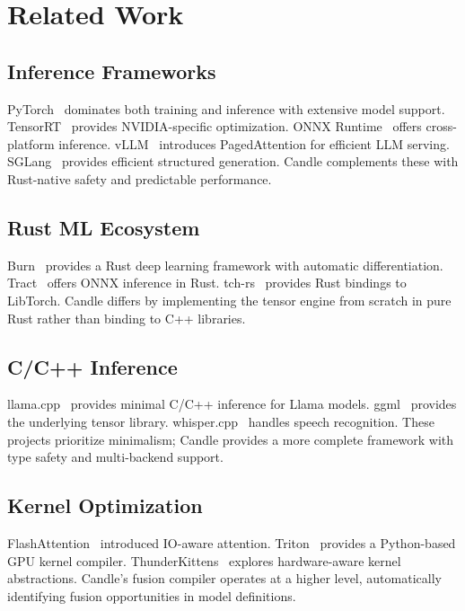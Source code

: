 \section{Related Work}

\label{sec:related}

\subsection{Inference Frameworks}

PyTorch~\cite{paszke2019pytorch} dominates both training and inference with extensive model support. TensorRT~\cite{tensorrt2017} provides NVIDIA-specific optimization. ONNX Runtime~\cite{onnxruntime2019} offers cross-platform inference. vLLM~\cite{kwon2023vllm} introduces PagedAttention for efficient LLM serving. SGLang~\cite{zheng2024sglang} provides efficient structured generation. Candle complements these with Rust-native safety and predictable performance.

\subsection{Rust ML Ecosystem}

Burn~\cite{burn2023} provides a Rust deep learning framework with automatic differentiation. Tract~\cite{tract2023} offers ONNX inference in Rust. tch-rs~\cite{tchrs2023} provides Rust bindings to LibTorch. Candle differs by implementing the tensor engine from scratch in pure Rust rather than binding to C++ libraries.

\subsection{C/C++ Inference}

llama.cpp~\cite{llamacpp2023} provides minimal C/C++ inference for Llama models. ggml~\cite{ggml2023} provides the underlying tensor library. whisper.cpp~\cite{whispercpp2023} handles speech recognition. These projects prioritize minimalism; Candle provides a more complete framework with type safety and multi-backend support.

\subsection{Kernel Optimization}

FlashAttention~\cite{dao2022flashattention,dao2023flashattention2} introduced IO-aware attention. Triton~\cite{tillet2019triton} provides a Python-based GPU kernel compiler. ThunderKittens~\cite{thunderkittens2024} explores hardware-aware kernel abstractions. Candle's fusion compiler operates at a higher level, automatically identifying fusion opportunities in model definitions.

